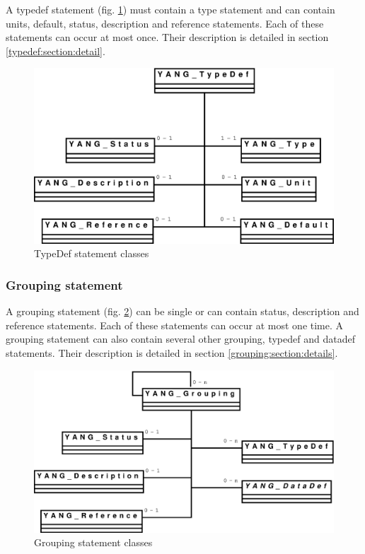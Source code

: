 \documentclass[a4paper]{article}
\begin{document}
A  typedef  statement  (fig.    \ref{typedef})  must  contain  a  type
statement  and can  contain  units, default,  status, description  and
reference  statements.  Each  of these  statements can  occur  at most
once.      Their     description     is    detailed     in     section
\ref{typedef:section:detail}.
\begin{figure}[htbp]
\begin{center}
\includegraphics[scale = .3]{typedef.eps}
\end{center}
\caption{TypeDef statement classes}
\label{typedef}
\end{figure}

\subsubsection{Grouping statement}
\label{grouping:section:global}

A grouping statement (fig.  \ref{grouping})  can be single or can
contain status,  description and reference statements.   Each of these
statements can occur at most one time. A grouping statement can also
contain  several  other  grouping,  typedef and  datadef  statements.
Their       description       is       detailed      in       section
\ref{grouping:section:details}.
\begin{figure}[htbp]
\begin{center}
\includegraphics[scale = .3]{grouping.eps}
\end{center}
\caption{Grouping statement classes}
\label{grouping}
\end{figure}
\end{document}
